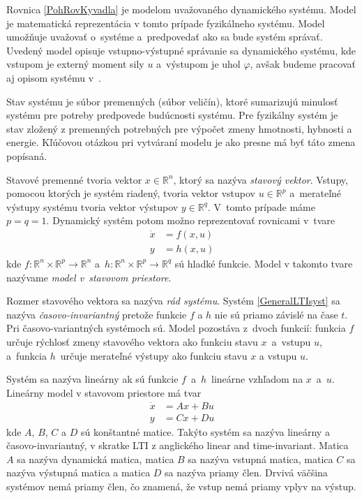 \documentclass[a4paper, 10pt, ]{article}
\begin{document}
Rovnica \eqref{PohRovKyvadla} je modelom uvažovaného dynamického systému. Model je matematická reprezentácia v tomto prípade fyzikálneho systému. Model umožňuje uvažovať o~systéme a~predpovedať ako sa bude systém správať. Uvedený model opisuje vstupno-výstupné správanie sa dynamického systému, kde vstupom je externý moment sily $u$ a~výstupom je uhol $\varphi$, avšak budeme pracovať aj opisom systému v~.

Stav systému je súbor premenných (súbor veličín), ktoré sumarizujú minulosť systému pre potreby predpovede budúcnosti systému. Pre fyzikálny systém je stav zložený z premenných potrebných pre výpočet zmeny hmotnosti, hybnosti a energie. Kľúčovou otázkou pri vytváraní modelu je ako presne má byť táto zmena popísaná.

Stavové premenné tvoria vektor $x \in  \mathbb{R}^n$, ktorý sa nazýva \emph{stavový vektor}. Vstupy, pomocou ktorých je systém riadený, tvoria vektor vstupov $u \in \mathbb{R}^p$ a~merateľné výstupy systému tvoria vektor výstupov $y \in \mathbb{R}^q$. V~tomto prípade máme $p = q = 1$. Dynamický systém  potom možno reprezentovať rovnicami v~tvare
\begin{subequations} \label{GeneralLTIsyst}
\begin{align}
	\dot{x} &= f(x,u) \\
	y &= h(x,u)
\end{align}
\end{subequations}
kde $f: \mathbb{R}^n \times \mathbb{R}^p \rightarrow \mathbb{R}^n$ a~$h: \mathbb{R}^n \times \mathbb{R}^p \rightarrow \mathbb{R}^q$ sú hladké funkcie. Model v takomto tvare nazývame \emph{model v~stavovom priestore}.





Rozmer stavového vektora sa nazýva \emph{rád systému}. Systém \eqref{GeneralLTIsyst} sa nazýva \emph{časovo-invariantný} pretože funkcie $f$ a $h$ nie sú priamo závislé na čase $t$. Pri časovo-variantných systémoch sú. Model pozostáva z~dvoch funkcií: funkcia $f$ určuje rýchlosť zmeny stavového vektora ako funkciu stavu $x$~a~vstupu $u$, a~funkcia $h$~určuje merateľné výstupy ako funkciu stavu $x$ a vstupu $u$.

Systém sa nazýva lineárny ak sú funkcie $f$~a~$h$~lineárne vzhľadom na $x$~a~$u$. Lineárny model v stavovom priestore má tvar
\begin{subequations} \label{LinearLTIsyst}
\begin{align}
	\dot{x} &= Ax + Bu \\
	y &= Cx + Du
\end{align}
\end{subequations}
kde $A$, $B$, $C$ a $D$ sú konštantné matice. Takýto systém sa nazýva lineárny a časovo-invariantný, v skratke LTI z anglického linear and time-invariant. Matica $A$ sa nazýva dynamická matica, matica $B$ sa nazýva vstupná matica, matica $C$ sa nazýva výstupná matica a matica $D$ sa nazýva priamy člen. Drvivá väčšina systémov nemá priamy člen, čo znamená, že vstup nemá priamy vplyv na výstup.
\end{document}
